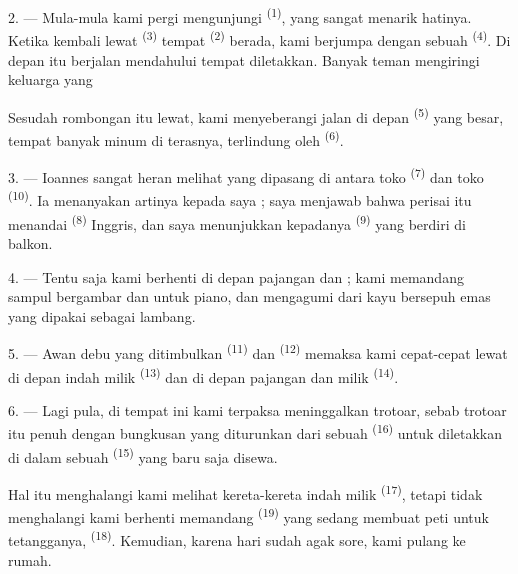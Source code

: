 2. --- Mula-mula kami pergi mengunjungi 
\textsuperscript{(1)}, yang sangat menarik hatinya. Ketika kembali
lewat  \textsuperscript{(3)} tempat  \textsuperscript{(2)} berada, kami berjumpa dengan sebuah
 \textsuperscript{(4)}. Di depan
 itu berjalan  mendahului
 tempat  diletakkan. Banyak
teman mengiringi keluarga yang 

Sesudah rombongan itu lewat, kami menyeberangi jalan di depan
 \textsuperscript{(5)} yang besar, tempat banyak
 minum  di terasnya, terlindung oleh
 \textsuperscript{(6)}.

3. --- Ioannes sangat heran melihat  yang
dipasang di antara toko 
\textsuperscript{(7)} dan toko 
\textsuperscript{(10)}. Ia menanyakan artinya kepada saya ; saya
menjawab bahwa perisai itu menandai 
\textsuperscript{(8)} Inggris, dan saya menunjukkan kepadanya
 \textsuperscript{(9)} yang berdiri di balkon.

\VUsaut{3.0mm}

4. --- Tentu saja kami berhenti di depan pajangan    dan  ; kami
memandang sampul bergambar  dan 
untuk piano, dan mengagumi  dari kayu bersepuh emas yang
dipakai sebagai lambang.

5. --- Awan debu yang ditimbulkan 
\textsuperscript{(11)} dan 
\textsuperscript{(12)} memaksa kami cepat-cepat lewat di depan
 indah milik 
\textsuperscript{(13)} dan di depan pajangan  dan
 milik  \textsuperscript{(14)}.

6. --- Lagi pula, di tempat ini kami terpaksa meninggalkan trotoar,
sebab trotoar itu penuh dengan bungkusan yang diturunkan dari sebuah
 \textsuperscript{(16)} untuk diletakkan di dalam
sebuah  \textsuperscript{(15)} yang baru saja disewa.

Hal itu menghalangi kami melihat kereta-kereta indah milik
 \textsuperscript{(17)}, tetapi tidak menghalangi
kami berhenti memandang  \textsuperscript{(19)}
yang sedang membuat peti untuk tetangganya,  \textsuperscript{(18)}. Kemudian, karena hari sudah agak
sore, kami pulang ke rumah.

